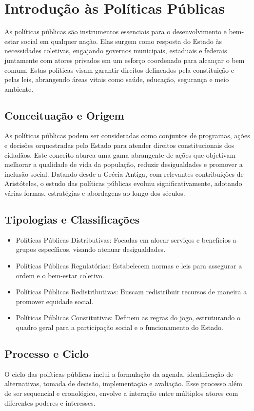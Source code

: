 \documentclass[
   article,       
   12pt,          
   oneside,       
   a4paper,       
   english,       
   brazil,        
   sumario=tradicional
   ]{abntex2}
\begin{document}
\section{Introdução às Políticas Públicas}
As políticas públicas são instrumentos essenciais para o desenvolvimento e bem-estar social em qualquer nação. Elas surgem como resposta do Estado às necessidades coletivas, engajando governos municipais, estaduais e federais juntamente com atores privados em um esforço coordenado para alcançar o bem comum. Estas políticas visam garantir direitos delineados pela constituição e pelas leis, abrangendo áreas vitais como saúde, educação, segurança e meio ambiente.

\subsection{Conceituação e Origem}
As políticas públicas podem ser consideradas como conjuntos de programas, ações e decisões orquestradas pelo Estado para atender direitos constitucionais dos cidadãos. Este conceito abarca uma gama abrangente de ações que objetivam melhorar a qualidade de vida da população, reduzir desigualdades e promover a inclusão social. Datando desde a Grécia Antiga, com relevantes contribuições de Aristóteles, o estudo das políticas públicas evoluiu significativamente, adotando várias formas, estratégias e abordagens ao longo dos séculos.

\subsection{Tipologias e Classificações}
\begin{itemize}
    \item Políticas Públicas Distributivas: Focadas em alocar serviços e benefícios a grupos específicos, visando atenuar desigualdades.
    \item Políticas Públicas Regulatórias: Estabelecem normas e leis para assegurar a ordem e o bem-estar coletivo.
    \item Políticas Públicas Redistributivas: Buscam redistribuir recursos de maneira a promover equidade social.
    \item Políticas Públicas Constitutivas: Definem as regras do jogo, estruturando o quadro geral para a participação social e o funcionamento do Estado.
\end{itemize}

\subsection{Processo e Ciclo}
O ciclo das políticas públicas inclui a formulação da agenda, identificação de alternativas, tomada de decisão, implementação e avaliação. Esse processo além de ser sequencial e cronológico, envolve a interação entre múltiplos atores com diferentes poderes e interesses.
\end{document}
